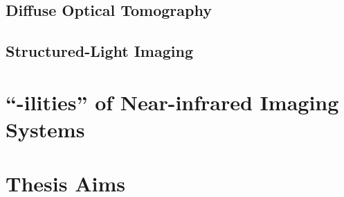 \subsection{Diffuse Optical Tomography}
\subsection{Structured-Light Imaging}



\section{``-ilities'' of Near-infrared Imaging Systems}
\label{chap:background:ilities}



\section{Thesis Aims}
\label{chap:background:aims}


